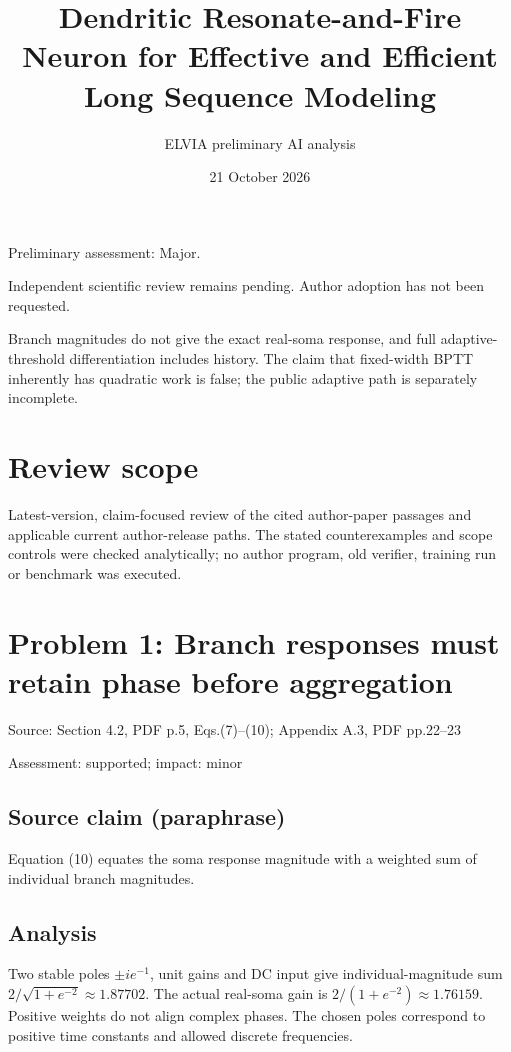 \documentclass[11pt]{article}
\begin{document}
\title{Dendritic Resonate-and-Fire Neuron for Effective and Efficient Long Sequence Modeling}

\author{ELVIA preliminary AI analysis}\date{21 October 2026}\maketitle

Preliminary assessment: Major.\par

Independent scientific review remains pending. Author adoption has not been requested.

Branch magnitudes do not give the exact real-soma response, and full adaptive-threshold differentiation includes history. The claim that fixed-width BPTT inherently has quadratic work is false; the public adaptive path is separately incomplete.

\section*{Review scope}

Latest-version, claim-focused review of the cited author-paper passages and applicable current author-release paths. The stated counterexamples and scope controls were checked analytically; no author program, old verifier, training run or benchmark was executed.

\section*{Problem 1: Branch responses must retain phase before aggregation}

Source: Section 4.2, PDF p.5, Eqs.(7)–(10); Appendix A.3, PDF pp.22–23

Assessment: supported; impact: minor

\subsection*{Source claim (paraphrase)}

Equation (10) equates the soma response magnitude with a weighted sum of individual branch magnitudes.

\subsection*{Analysis}

Two stable poles \(\pm ie^{-1}\), unit gains and DC input give individual-magnitude sum \(2/\sqrt{1+e^{-2}}\approx1.87702\). The actual real-soma gain is \(2/(1+e^{-2})\approx1.76159\). Positive weights do not align complex phases. The chosen poles correspond to positive time constants and allowed discrete frequencies.
\end{document}
